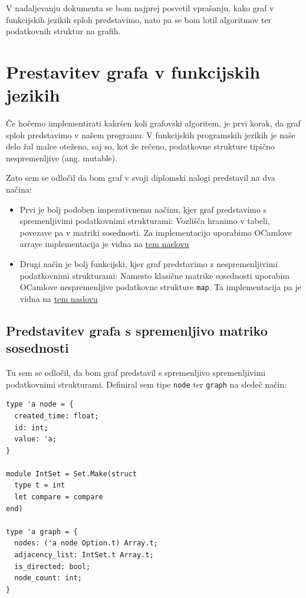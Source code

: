 \documentclass[mat1, tisk]{fmfdelo}
\begin{document}
V nadaljevanju dokumenta se bom najprej posvetil vprašanju, kako graf v funkcijskih jezikih sploh predstavimo, nato pa se bom lotil algoritmov ter podatkovnih struktur na grafih.


\section{Prestavitev grafa v funkcijskih jezikih}

Če hočemo implementirati kakršen koli grafovski algoritem, je prvi korak, da graf sploh predstavimo v našem programu. V funkcijskih programskih jezikih je naše delo žal
malce oteženo, saj so, kot že rečeno, podatkovne strukture tipično nespremenljive (ang. mutable).

Zato sem se odločil da bom graf v svoji diplomski nalogi predstavil na dva načina:
\begin{itemize}
  \item Prvi je bolj podoben imperativnemu načinu, kjer graf predstavimo s spremenljivimi podatkovnimi strukturami: Vozlišča hranimo v tabeli, povezave pa v matriki sosednosti.
        Za implementacijo uporabimo OCamlove arraye implementacija je vidna na 
        \href{https://github.com/tjazerzen/parallelisation-of-graph-algorithms-in-functional-programming-languages/blob/predstavitev_grafa_z_arrayi_ter_mnozicami/playground/graph/graph.ml}{tem naslovu}
  \item Drugi način je bolj funkcijski, kjer graf predstavimo z nespremenljivimi podatkovnimi strukturami: Namesto klasične matrike sosednosti uporabim OCamlove nespremenljive
        podatkovne strukture \texttt{map}. Ta implementacija pa je vidna na
        \href{https://github.com/tjazerzen/parallelisation-of-graph-algorithms-in-functional-programming-languages/blob/master/playground/graph/graph.ml}{tem naslovu}
\end{itemize}

\subsection{Predstavitev grafa s spremenljivo matriko sosednosti} \label{sec:predstavitev_grafa_s_spremenljivo_matriko_sosednosti}

Tu sem se odločil, da bom graf predstavil s spremenljivo spremenljivimi podatkovnimi strukturami. Definiral sem tipe \texttt{node} ter \texttt{graph} na sledeč način:

\begin{lstlisting}
type 'a node = {
  created_time: float;
  id: int;
  value: 'a;
}

module IntSet = Set.Make(struct
  type t = int
  let compare = compare
end)

type 'a graph = {
  nodes: ('a node Option.t) Array.t;
  adjacency_list: IntSet.t Array.t;
  is_directed: bool;
  node_count: int;
}
\end{lstlisting}
\end{document}
